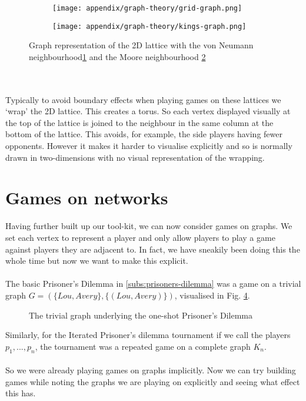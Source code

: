 \begin{figure}
	\centering
	\begin{subfigure}{.47\textwidth}
		\centering
		\texttt{[image: appendix/graph-theory/grid-graph.png]}
		\caption{}
		\label{fig:graph-v-n}
	\end{subfigure}
	\begin{subfigure}{.47\textwidth}
		\centering
		\texttt{[image: appendix/graph-theory/kings-graph.png]}
		\caption{}
		\label{fig:graph-m}
	\end{subfigure}
	\caption{Graph representation of the 2D lattice with the von Neumann neighbourhood\ref{fig:graph-v-n} and the Moore neighbourhood \ref{fig:graph-m}}
	\label{fig:graph-neighbourhoods}
\end{figure}\\
\\
Typically to avoid boundary effects when playing games on these lattices we `wrap' the 2D lattice. This creates a torus. So each vertex displayed visually at the top of the lattice is joined to the neighbour in the same column at the bottom of the lattice. This avoids, for example, the side players having fewer opponents. However it makes it harder to visualise explicitly and so is normally drawn in two-dimensions with no visual representation of the wrapping.
\section{Games on networks}
Having further built up our tool-kit, we can now consider games on graphs. We set each vertex to represent a player and only allow players to play a game against players they are adjacent to. In fact, we have sneakily been doing this the whole time but now we want to make this explicit.\\
\\
The basic Prisoner's Dilemma in \ref{subs:prisoners-dilemma} was a game on a trivial graph $G=(\{Lou,Avery\},\{(Lou,Avery)\})$, visualised in Fig. \ref{fig:p-d-graph}.
\begin{figure}[h]
	\centering
	\caption{The trivial graph underlying the one-shot Prisoner's Dilemma}
	\label{fig:p-d-graph}
\end{figure}
Similarly, for the Iterated Prisoner's dilemma tournament if we call the players $p_1,...,p_n$, the tournament was a repeated game on a complete graph $K_n$.\\
\\
So we were already playing games on graphs implicitly. Now we can try building games while noting the graphs we are playing on explicitly and seeing what effect this has.
